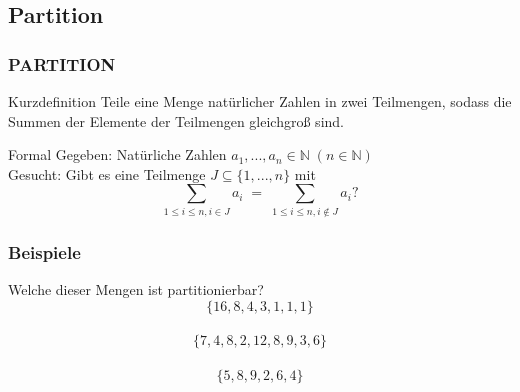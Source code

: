 \subsection{Partition}
\begin{frame}
	\frametitle{PARTITION}
	\begin{block}{Kurzdefinition}
	Teile eine Menge natürlicher Zahlen in zwei Teilmengen, sodass die Summen der Elemente der Teilmengen gleichgroß sind.
	\end{block}
	\begin{block}{Formal}
	Gegeben: Natürliche Zahlen $a_1,...,a_n \in \mathbb{N} \; (n \in 	\mathbb{N})$\\
	Gesucht: Gibt es eine Teilmenge $J \subseteq \{1,...,n\}$ mit\\
	\[\sum\limits_{1 \leq i \leq n, i \in J}a_i \; = \;
	\sum\limits_{1 \leq i \leq n, i \notin J}a_i \text{?}\]
	\end{block}
\end{frame}
\begin{frame}
	\frametitle{Beispiele}
	Welche dieser Mengen ist partitionierbar?
	\[\{16,8,4,3,1,1,1\}\]\\
	\[\{7,4,8,2,12,8,9,3,6\}\]\\
	\[\{5,8,9,2,6,4\}\]
\end{frame}

